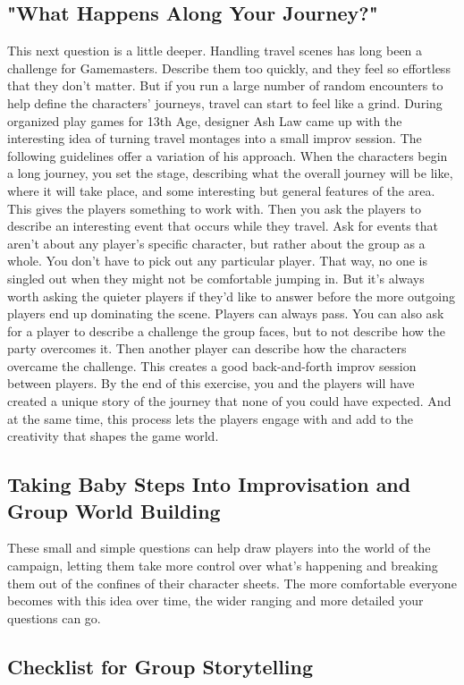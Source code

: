 \documentclass[10pt,a4paper,twoside,bg=print,twocolumn,openany,nodeprecatedcode]{dndbook}
\begin{document}
\subsection{"What Happens Along Your Journey?"}
This next question is a little deeper. Handling travel scenes has long been a challenge for Gamemasters. Describe them too quickly, and they feel so effortless that they don't matter. But if you run a large number of random encounters to help define the characters' journeys, travel can start to feel like a grind.
During organized play games for 13th Age, designer Ash Law came up with the interesting idea of turning travel montages into a small improv session. The following guidelines offer a variation of his approach.
When the characters begin a long journey, you set the stage, describing what the overall journey will be like, where it will take place, and some interesting but general features of the area. This gives the players something to work with. Then you ask the players to describe an interesting event that occurs while they travel. Ask for events that aren't about any player's specific character, but rather about the group as a whole.
You don't have to pick out any particular player. That way, no one is singled out when they might not be comfortable jumping in. But it's always worth asking the quieter players if they'd like to answer before the more outgoing players end up dominating the scene. Players can always pass.
You can also ask for a player to describe a challenge the group faces, but to not describe how the party overcomes it. Then another player can describe how the characters overcame the challenge. This creates a good back-and-forth improv session between players.
By the end of this exercise, you and the players will have created a unique story of the journey that none of you could have expected. And at the same time, this process lets the players engage with and add to the creativity that shapes the game world.
\subsection{Taking Baby Steps Into Improvisation and Group World Building}
These small and simple questions can help draw players into the world of the campaign, letting them take more control over what's happening and breaking them out of the confines of their character sheets. The more comfortable everyone becomes with this idea over time, the wider ranging and more detailed your questions can go.
\subsection{Checklist for Group Storytelling}
\end{document}
